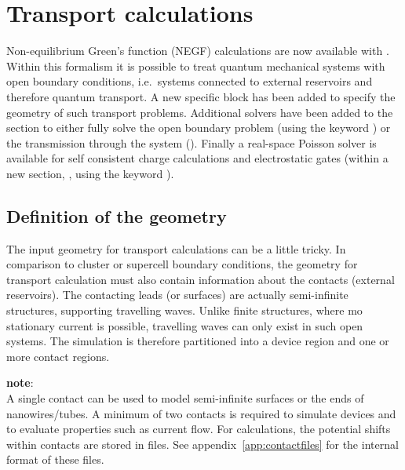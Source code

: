 \chapter{Transport calculations}
\label{app:transp}

Non-equilibrium Green's function (NEGF) calculations are now available with
{\dftbp}. Within this formalism it is possible to treat quantum mechanical
systems with open boundary conditions, i.e.\ systems connected to external
reservoirs and therefore quantum transport.  A new specific 
block has been added to specify the geometry of such transport problems.
Additional solvers have been added to the  section to either
fully solve the open boundary problem (using the keyword )
or the transmission through the system (). Finally a
real-space Poisson solver is available for self consistent charge calculations
and electrostatic gates (within a new section, , using the
keyword ).

\section{Definition of the geometry}
\label{sec:transport.geometry}

The input geometry for transport calculations can be a little tricky. In
comparison to cluster or supercell boundary conditions, the geometry for
transport calculation must also contain information about the contacts (external
reservoirs). The contacting leads (or surfaces) are actually semi-infinite
structures, supporting travelling waves. Unlike finite structures, where mo
stationary current is possible, travelling waves can only exist in such open
systems.  The simulation is therefore partitioned into a device region and one
or more contact regions.

{\bf note}:\\ A single contact can be used to model semi-infinite surfaces or
the ends of nanowires/tubes. A minimum of two contacts is required to simulate
devices and to evaluate properties such as current flow. For 
calculations, the potential shifts within contacts are stored in files. See
appendix~\ref{app:contactfiles} for the internal format of these files.

